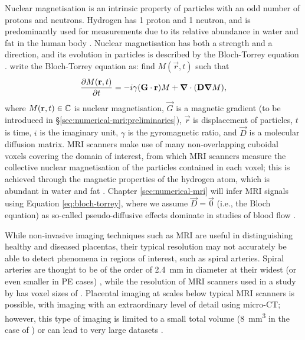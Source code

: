        Nuclear magnetisation is an intrinsic property of particles with an odd number of protons and neutrons. Hydrogen has 1 proton and 1 neutron, and is predominantly used for measurements due to its relative abundance in water and fat in the human body \cite{bushbergEssentialPhysicsMedical2012}. Nuclear magnetisation has both a strength and a direction, and its evolution in particles is described by the Bloch-Torrey equation \cite{bushbergEssentialPhysicsMedical2012,nguyenFiniteElementsMethod2014}. \citeauthor{nguyenFiniteElementsMethod2014} \cite{nguyenFiniteElementsMethod2014} write the Bloch-Torrey equation as: find $M(\vec{r}, t)$ such that 
        \begin{equation}
            \pdv{M(\boldsymbol{\mathbf{r}}, t)}{t} = -i \gamma (\boldsymbol{\mathbf{G}} \cdot \boldsymbol{\mathbf{r}}) M + \boldsymbol{\mathbf{\nabla}} \cdot (\boldsymbol{\mathbf{D}} \boldsymbol{\mathbf{\nabla}} M),
            \label{eq:bloch-torrey}
        \end{equation}
        where $M(\boldsymbol{\mathbf{r}}, t) \in \mathbb{C}$ is nuclear magnetisation, $\vec{G}$ is a magnetic gradient (to be introduced in \S\ref{sec:numerical-mri:preliminaries}), $\vec{r}$ is displacement of particles, $t$ is time, $i$ is the imaginary unit, $\gamma$ is the gyromagnetic ratio, and $\vec{D}$ is a molecular diffusion matrix. MRI scanners make use of many non-overlapping cuboidal voxels covering the domain of interest, from which MRI scanners measure the collective nuclear magnetisation of the particles contained in each voxel; this is achieved through the magnetic properties of the hydrogen atom, which is abundant in water and fat \cite{bergerHowDoesIt2002}. Chapter \ref{sec:numerical-mri} will infer MRI signals using Equation \eqref{eq:bloch-torrey}, where we assume $\vec{D} = \vec{0}$ (i.e., the Bloch equation) as so-called pseudo-diffusive effects dominate in studies of blood flow \cite{torreyBlochEquationsDiffusion1956,lebihanWhatCanWe2019}.

        While non-invasive imaging techniques such as MRI are useful in distinguishing healthy and diseased placentas, their typical resolution may not accurately be able to detect phenomena in regions of interest, such as spiral arteries. Spiral arteries are thought to be of the order of \qty{2.4}{\milli\metre} in diameter at their widest (or even smaller in PE cases) \cite{burtonRheologicalPhysiologicalConsequences2009}, while the resolution of MRI scanners used in a study by \citeauthor{dellschaftHaemodynamicsHumanPlacenta2020} \cite{dellschaftHaemodynamicsHumanPlacenta2020} has voxel sizes of . Placental imaging at scales below typical MRI scanners is possible, with \citeauthor{tunMassivelyMultiscaleApproach2021} \cite{tunMassivelyMultiscaleApproach2021} imaging with an extraordinary level of detail using micro-CT; however, this type of imaging is limited to a small total volume (\qty{8}{\milli\meter^3} in the case of \cite{tunMassivelyMultiscaleApproach2021}) or can lead to very large datasets \cite{aughwaneMicroCTHistologicalInvestigation2019}. 

